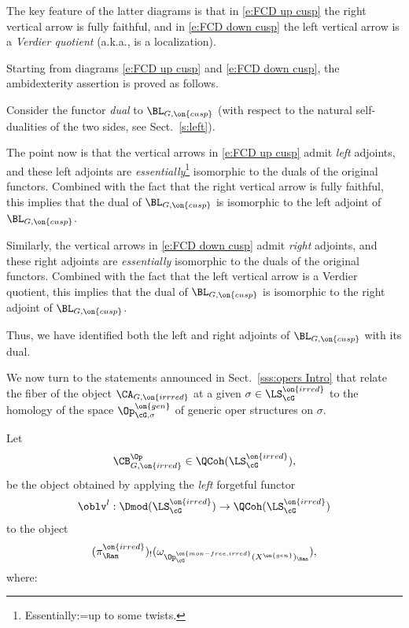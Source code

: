 \documentclass[9pt]{amsart}
\theoremstyle{remark}
\theoremstyle{definition}
\theoremstyle{remark}
\newcommand{\secref}[1]{Sect.~\ref{#1}}
\numberwithin{equation}{section}
\begin{document}
\medskip

The key feature of the latter diagrams is that in \eqref{e:FCD up cusp} the right vertical arrow is fully faithful,
and in \eqref{e:FCD down cusp} the left vertical arrow is a \emph{Verdier quotient} (a.k.a., is a localization).  

\sssec{}

Starting from diagrams \eqref{e:FCD up cusp} and \eqref{e:FCD down cusp}, the ambidexterity assertion is proved
as follows.

\medskip

Consider the functor \emph{dual} to $\BL_{G,\on{cusp}}$ (with respect to the natural self-dualities of the two
sides, see \secref{s:left}). 

\medskip

The point now is that the vertical arrows in \eqref{e:FCD up cusp} admit \emph{left} adjoints, and these left adjoints
are \emph{essentially}\footnote{Essentially:=up to some twists.} isomorphic to the duals of the original functors. 
Combined with the fact that the right vertical arrow is fully faithful, this implies that the dual of $\BL_{G,\on{cusp}}$ is isomorphic to 
the left adjoint of $\BL_{G,\on{cusp}}$.

\medskip

Similarly, the vertical arrows in \eqref{e:FCD down cusp} admit \emph{right} adjoints, and these right adjoints
are \emph{essentially} isomorphic to the duals of the original functors. 
Combined with the fact that the left vertical arrow is a Verdier quotient, 
this implies that the dual of $\BL_{G,\on{cusp}}$ is isomorphic to the right adjoint of $\BL_{G,\on{cusp}}$.

\medskip

Thus, we have identified both the left and right adjoints of $\BL_{G,\on{cusp}}$ with its dual.

 \label{ss:opers Intro}

We now turn to the statements announced in \secref{sss:opers Intro} that relate the fiber of the object $\CA_{G,\on{irrred}}$
at a given $\sigma\in \LS_\cG^{\on{irred}}$ to the homology of the space $\Op^{\on{gen}}_{\cG,\sigma}$
of generic oper structures on $\sigma$. 

\sssec{}

Let 
$$\CB^{\Op}_{G,\on{irred}}\in \QCoh(\LS^{\on{irred}}_\cG),$$
be the object obtained by applying the \emph{left} forgetful functor
$$\oblv^l:\Dmod(\LS^{\on{irred}}_\cG)\to \QCoh(\LS^{\on{irred}}_\cG)$$
to the object
$$(\pi^{\on{irred}}_\Ran)_!(\omega_{\Op^{\on{mon-free,irred}}_\cG(X^{\on{gen}})_\Ran}),$$
where:
\end{document}
